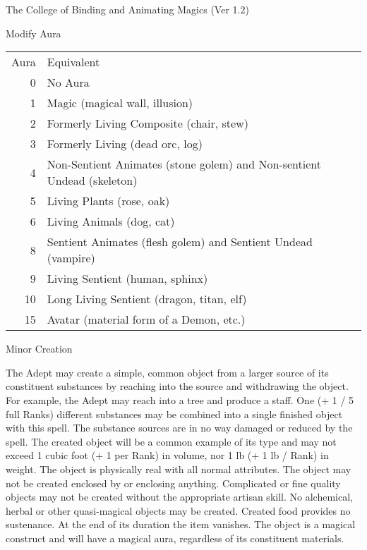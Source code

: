 \begin{Chapter}{The College of Binding and Animating Magics (Ver 1.2)}
\begin{spell}[G-6]{Modify Aura}
\begin{effects}
\begin{tabularx}{\columnwidth}{rX}
Aura	& Equivalent \\
0	& No Aura \\
1	& Magic (magical wall, illusion) \\
2	& Formerly Living Composite (chair, stew) \\
3	& Formerly Living (dead orc, log) \\
4	& Non-Sentient Animates (stone golem) and Non-sentient Undead (skeleton) \\
5	& Living Plants (rose, oak) \\
6	& Living Animals (dog, cat) \\
8	& Sentient Animates (flesh golem) and Sentient Undead (vampire) \\
9	& Living Sentient (human, sphinx) \\
10	& Long Living Sentient (dragon, titan, elf) \\
15	& Avatar (material form of a Demon, etc.) \\
\end{tabularx}
\end{effects}
\end{spell}

\begin{spell}[G-7]{Minor Creation}

\begin{effects}
The Adept may create a simple, common object from a larger source of
its constituent substances by reaching into the source and withdrawing
the object.  For example, the Adept may reach into a tree and produce
a staff.  One (+ 1 / 5 full Ranks) different substances may be
combined into a single finished object with this spell.  The substance
sources are in no way damaged or reduced by the spell.  The created
object will be a common example of its type and may not exceed 1 cubic
foot (+ 1 per Rank) in volume, nor 1 lb (+ 1 lb / Rank) in weight.
The object is physically real with all normal attributes. The object
may not be created enclosed by or enclosing anything. Complicated or
fine quality objects may not be created without the appropriate
artisan skill.  No alchemical, herbal or other quasi-magical objects
may be created.  Created food provides no sustenance. At the end of
its duration the item vanishes. The object is a magical construct and
will have a magical aura, regardless of its constituent materials.
\end{effects}
\end{spell}


\end{Chapter}
